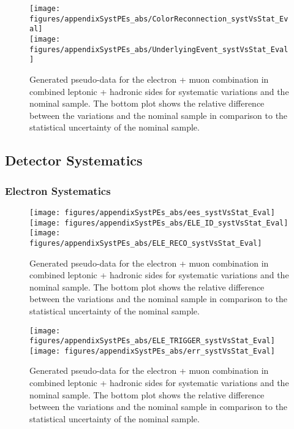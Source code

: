 \begin{figure}[!hb]
\begin{center}
        \texttt{[image: figures/appendixSystPEs\_abs/ColorReconnection\_systVsStat\_Eval]}\\
        \texttt{[image: figures/appendixSystPEs\_abs/UnderlyingEvent\_systVsStat\_Eval]}
\caption{Generated pseudo-data for the electron + muon combination in combined leptonic + hadronic sides for systematic variations and the nominal \ttbar sample. The bottom plot shows the relative difference between the variations and the nominal sample in comparison to the statistical uncertainty of the nominal sample.}   
\label{fig:systematicVar_lephad_modelling_2}
\end{center}
\end{figure}

\clearpage
\subsection{Detector Systematics}
\subsubsection{Electron Systematics}

\begin{figure}[!hb]
\begin{center}
        \texttt{[image: figures/appendixSystPEs\_abs/ees\_systVsStat\_Eval]}\\
        \texttt{[image: figures/appendixSystPEs\_abs/ELE\_ID\_systVsStat\_Eval]}\\
        \texttt{[image: figures/appendixSystPEs\_abs/ELE\_RECO\_systVsStat\_Eval]}
        
\caption{Generated pseudo-data for the electron + muon combination in combined leptonic + hadronic sides for systematic variations and the nominal \ttbar sample. The bottom plot shows the relative difference between the variations and the nominal sample in comparison to the statistical uncertainty of the nominal sample.}   
\label{fig:systematicVar_lephad_ELE_1}
\end{center}
\end{figure}

\begin{figure}[!hb]
\begin{center}
        \texttt{[image: figures/appendixSystPEs\_abs/ELE\_TRIGGER\_systVsStat\_Eval]}\\
        \texttt{[image: figures/appendixSystPEs\_abs/err\_systVsStat\_Eval]}
\caption{Generated pseudo-data for the electron + muon combination in combined leptonic + hadronic sides for systematic variations and the nominal \ttbar sample. The bottom plot shows the relative difference between the variations and the nominal sample in comparison to the statistical uncertainty of the nominal sample.}   
\label{fig:systematicVar_lephad_ELE_2}
\end{center}
\end{figure}


